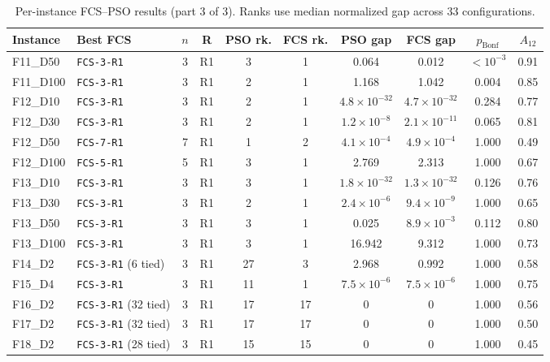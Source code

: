 \begin{table}[H]
\centering
\footnotesize
\caption{Per-instance FCS--PSO results (part 3 of 3). Ranks use median normalized gap across 33 configurations.}
\label{tab:function_level_full_3}
\setlength{\tabcolsep}{3pt}
\begin{tabular}{llcccccccc}
\toprule
\textbf{Instance} & \textbf{Best FCS} & \boldmath$n$ & \textbf{R} & \textbf{PSO rk.} & \textbf{FCS rk.} & \textbf{PSO gap} & \textbf{FCS gap} & \boldmath$p_{\mathrm{Bonf}}$ & \boldmath$A_{12}$ \\
\midrule
F11\_D50 & \texttt{FCS-3-R1} & 3 & R1 & 3 & 1 & 0.064 & 0.012 & $<10^{-3}$ & 0.91 \\
F11\_D100 & \texttt{FCS-3-R1} & 3 & R1 & 2 & 1 & 1.168 & 1.042 & 0.004 & 0.85 \\
F12\_D10 & \texttt{FCS-3-R1} & 3 & R1 & 2 & 1 & $4.8\!\times10^{-32}$ & $4.7\!\times10^{-32}$ & 0.284 & 0.77 \\
F12\_D30 & \texttt{FCS-3-R1} & 3 & R1 & 2 & 1 & $1.2\!\times10^{-8}$ & $2.1\!\times10^{-11}$ & 0.065 & 0.81 \\
F12\_D50 & \texttt{FCS-7-R1} & 7 & R1 & 1 & 2 & $4.1\!\times10^{-4}$ & $4.9\!\times10^{-4}$ & 1.000 & 0.49 \\
F12\_D100 & \texttt{FCS-5-R1} & 5 & R1 & 3 & 1 & 2.769 & 2.313 & 1.000 & 0.67 \\
F13\_D10 & \texttt{FCS-3-R1} & 3 & R1 & 3 & 1 & $1.8\!\times10^{-32}$ & $1.3\!\times10^{-32}$ & 0.126 & 0.76 \\
F13\_D30 & \texttt{FCS-3-R1} & 3 & R1 & 2 & 1 & $2.4\!\times10^{-6}$ & $9.4\!\times10^{-9}$ & 1.000 & 0.65 \\
F13\_D50 & \texttt{FCS-3-R1} & 3 & R1 & 3 & 1 & 0.025 & $8.9\!\times10^{-3}$ & 0.112 & 0.80 \\
F13\_D100 & \texttt{FCS-3-R1} & 3 & R1 & 3 & 1 & 16.942 & 9.312 & 1.000 & 0.73 \\
F14\_D2 & \texttt{FCS-3-R1} (6 tied) & 3 & R1 & 27 & 3 & 2.968 & 0.992 & 1.000 & 0.58 \\
F15\_D4 & \texttt{FCS-3-R1} & 3 & R1 & 11 & 1 & $7.5\!\times10^{-6}$ & $7.5\!\times10^{-6}$ & 1.000 & 0.75 \\
F16\_D2 & \texttt{FCS-3-R1} (32 tied) & 3 & R1 & 17 & 17 & 0 & 0 & 1.000 & 0.56 \\
F17\_D2 & \texttt{FCS-3-R1} (32 tied) & 3 & R1 & 17 & 17 & 0 & 0 & 1.000 & 0.50 \\
F18\_D2 & \texttt{FCS-3-R1} (28 tied) & 3 & R1 & 15 & 15 & 0 & 0 & 1.000 & 0.45 \\

\end{tabular}
\end{table}
